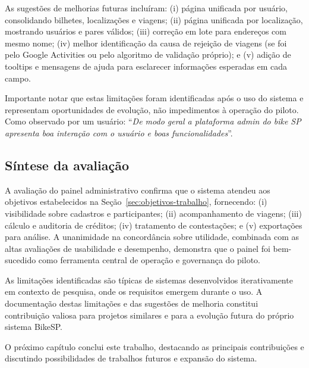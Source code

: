 As sugestões de melhorias futuras incluíram: (i) página unificada por usuário, consolidando bilhetes, localizações e viagens; (ii) página unificada por localização, mostrando usuários e pares válidos; (iii) correção em lote para endereços com mesmo nome; (iv) melhor identificação da causa de rejeição de viagens (se foi pelo Google Activities ou pelo algoritmo de validação próprio); e (v) adição de tooltips e mensagens de ajuda para esclarecer informações esperadas em cada campo.

Importante notar que estas limitações foram identificadas após o uso do sistema e representam oportunidades de evolução, não impedimentos à operação do piloto. Como observado por um usuário: ``\textit{De modo geral a plataforma admin do bike SP apresenta boa interação com o usuário e boas funcionalidades}''.

\subsection{Síntese da avaliação}

A avaliação do painel administrativo confirma que o sistema atendeu aos objetivos estabelecidos na Seção~\ref{sec:objetivos-trabalho}, fornecendo: (i) visibilidade sobre cadastros e participantes; (ii) acompanhamento de viagens; (iii) cálculo e auditoria de créditos; (iv) tratamento de contestações; e (v) exportações para análise. A unanimidade na concordância sobre utilidade, combinada com as altas avaliações de usabilidade e desempenho, demonstra que o painel foi bem-sucedido como ferramenta central de operação e governança do piloto.

As limitações identificadas são típicas de sistemas desenvolvidos iterativamente em contexto de pesquisa, onde os requisitos emergem durante o uso. A documentação destas limitações e das sugestões de melhoria constitui contribuição valiosa para projetos similares e para a evolução futura do próprio sistema BikeSP.

O próximo capítulo conclui este trabalho, destacando as principais contribuições e discutindo possibilidades de trabalhos futuros e expansão do sistema.



